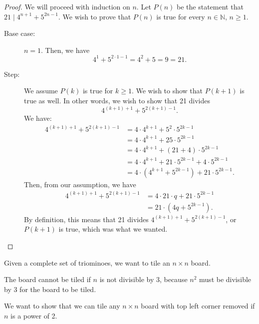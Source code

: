 \documentclass[a4paper]{article}
\begin{document}
\begin{proof}
	We will proceed with induction on \( n \). Let \( P(n) \) be the statement that \( 21 \mid 4^{n+1} + 5^{2n-1} \). We wish to prove that \( P(n) \) is true for every \( n \in \mathbb{N} \), \( n \ge 1 \).
	\begin{description}
		\item[Base case:] \( n = 1 \). Then, we have \[
				4^1+5^{2 \cdot 1 - 1} = 4^2 + 5 = 9 = 21
		.\] 
		\item[Step:] We assume \( P(k) \) is true for \( k \ge 1 \). We wish to show that \( P(k+1) \) is true as well. In other words, we wish to show that 21 divides \[
			4^{(k+1)+1} + 5^{2(k+1)-1}
		.\] We have:
		\begin{align*}
			4^{(k+1)+1} + 5^{2(k+1)-1} &= 4 \cdot 4^{k+1} + 5^2 \cdot 5^{2k-1} \\
																	&= 4 \cdot 4^{k+1} + 25 \cdot 5^{2k-1} \\
																	&= 4 \cdot 4^{k+1} + (21 + 4) \cdot 5^{2k-1} \\
																	&= 4 \cdot 4^{k+1} + 21 \cdot 5^{2k-1} + 4 \cdot 5^{2k-1} \\
																	&= 4 \cdot \left( 4^{k+1} + 5^{2k-1}\right) + 21 \cdot 5^{2k-1}
		.\end{align*}
		Then, from our assumption, we have 
		\begin{align*}
			4^{(k+1)+1} + 5^{2(k+1)-1}  &= 4 \cdot 21\cdot q + 21 \cdot 5^{2k-1}  \\
																	&= 21 \cdot (4q + 5^{2k-1})
		.\end{align*}
		By definition, this means that 21 divides \( 4^{(k+1)+1} + 5^{2(k+1)-1} \), or \( P(k+1) \) is true, which was what we wanted.
	\end{description}
\end{proof}

\begin{eg}
	Given a complete set of triominoes, we want to tile an \( n\times n \) board. 
	\begin{observe}
		The board cannot be tiled if \( n \) is not divisible by 3, because \( n^2 \) must be divisible by 3 for the board to be tiled.
	\end{observe}
	We want to show that we can tile any \( n \times n \) board with top left corner removed if \( n \) is a power of 2.
\end{eg}
\end{document}
